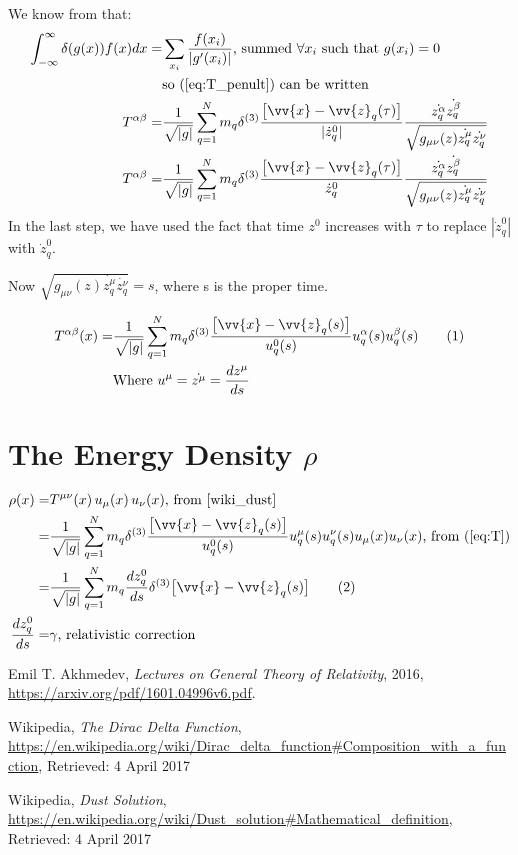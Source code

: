 \documentclass[]{article}
\newcommand\numberthis{\addtocounter{equation}{1}\tag{\theequation}}
\begin{document}
We know from \cite{wiki_delta} that:
\begin{align*}
\int_{-\infty}^{\infty} \delta(g(x)) f(x) dx  =& \sum_{x_i} \frac{f(x_i)}{|g'(x_i)|} \text{, summed $ \forall x_i$ such that $g(x_i)=0$}\\
&\text{so (\ref{eq:T_penult}) can be written}\\
 T^{\alpha\beta} =& \frac{1}{\sqrt{|g|}} \sum_{q=1}^{N} m_q  \delta^{(3)} \frac{\big[\vv{x}-\vv{z}_q(\tau)\big]}{|\dot{z}_q^0|}\frac{\dot{z_q^\alpha}  \dot{z_q^\beta}}{\sqrt{g_{\mu\nu}(z)\dot{z_q^\mu}\dot{z_q^\nu}}} \\
 T^{\alpha\beta} =& \frac{1}{\sqrt{|g|}} \sum_{q=1}^{N} m_q  \delta^{(3)} \frac{\big[\vv{x}-\vv{z}_q(\tau)\big]}{\dot{z}_q^0}\frac{\dot{z_q^\alpha}  \dot{z_q^\beta}}{\sqrt{g_{\mu\nu}(z)\dot{z_q^\mu}\dot{z_q^\nu}}}
\end{align*}
In the last step, we have used the fact that time $z^0$ increases with $\tau$ to replace $|\dot{z}_q^0|$ with $\dot{z}_q^0$.


Now $\sqrt{g_{\mu\nu}(z)\dot{z_q^\mu}\dot{z_q^\nu}}=s$, where s is the proper time.

\begin{align*}
T^{\alpha\beta}(x) =& \frac{1}{\sqrt{|g|}} \sum_{q=1}^{N} m_q \delta^{(3)} \frac{\big[\vv{x}-\vv{z}_q(s)\big]}{u_q^0 (s)} u_q^\alpha (s) u_q^\beta (s)  \numberthis \label{eq:T}\\
&\text{Where $u^{\mu} = \dot{z^\mu} = \frac{d z^\mu}{d s}$}
\end{align*}





\section{The Energy Density $\rho$}

\begin{align*}
\rho(x) =& T^{\mu\nu}(x) \, u_\mu(x) \, u_\nu(x) \text{, from \cite{wiki_dust}}\\
=& \frac{1}{\sqrt{|g|}} \sum_{q=1}^{N} m_q \delta^{(3)} \frac{\big[\vv{x}-\vv{z}_q(s)\big]}{u_q^0 (s)} u_q^\mu (s) u_q^\nu (s) u_\mu(x) u_\nu(x) \text{, from (\ref{eq:T})}\\
=&\frac{1}{\sqrt{|g|}} \sum_{q=1}^{N} m_q \frac{d z^0_q}{d s} \delta^{(3)} \big[\vv{x}-\vv{z}_q(s)\big] \numberthis \label{eq:density} \\
\frac{d z^0_q}{d s}=&\gamma \text{, relativistic correction}
\end{align*}


\begin{thebibliography}{9}
	
	Emil T. Akhmedev,
	\emph{Lectures on General Theory of Relativity},
	2016,
	\url{https://arxiv.org/pdf/1601.04996v6.pdf}.
	
	Wikipedia,
	\emph{The Dirac Delta Function},
	\url{https://en.wikipedia.org/wiki/Dirac_delta_function#Composition_with_a_function},
	Retrieved: 4 April 2017
	
	Wikipedia,
	\emph{Dust Solution},
	\url{https://en.wikipedia.org/wiki/Dust_solution#Mathematical_definition},
	Retrieved: 4 April 2017
\end{thebibliography}
\end{document}
